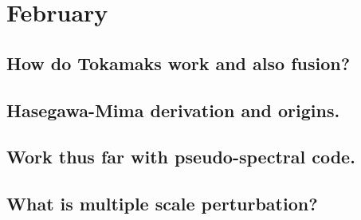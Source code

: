 \section{February}

\subsection{How do Tokamaks work and also fusion?}

\subsection{Hasegawa-Mima derivation and origins.}

\subsection{Work thus far with pseudo-spectral code.}

\subsection{What is multiple scale perturbation?}


